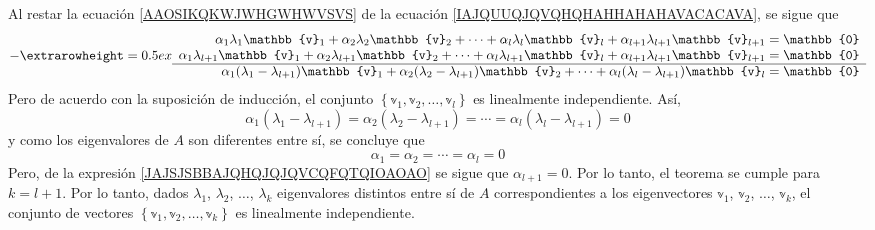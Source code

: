 \begin{theorem}
\begin{equation}
    \end{equation}
    Al restar la ecuación \eqref{AAOSIKQKWJWHGWHWVSVS} de la ecuación \eqref{IAJQUUQJQVQHQHAHHAHAHAVACACAVA}, se sigue que
    $$- {\extrarowheight = 0.5ex
    \begin{array}{r}
        \alpha_1\lambda_1\mathbb{v}_1 + \alpha_2\lambda_2\mathbb{v}_2 + \cdots + \alpha_l\lambda_l\mathbb{v}_l + \alpha_{l+1}\lambda_{l+1}\mathbb{v}_{l+1} = \mathbb{0} \\
        \alpha_1\lambda_{l+1}\mathbb{v}_1 + \alpha_2\lambda_{l+1}\mathbb{v}_2 + \cdots + \alpha_l\lambda_{l+1}\mathbb{v}_l + \alpha_{l+1}\lambda_{l+1}\mathbb{v}_{l+1} = \mathbb{0} \\
        \hline
        \alpha_1(\lambda_1 - \lambda_{l+1})\mathbb{v}_1 + \alpha_2(\lambda_2 - \lambda_{l+1})\mathbb{v}_2 + \cdots + \alpha_l(\lambda_l - \lambda_{l+1})\mathbb{v}_l = \mathbb{0}
    \end{array}}$$
    Pero de acuerdo con la suposición de inducción, el conjunto $\left\{ \mathbb{v}_1, \mathbb{v}_2, \dots, \mathbb{v}_l \right\}$ es linealmente independiente. Así,
    $$\alpha_1(\lambda_1 - \lambda_{l+1}) = \alpha_2(\lambda_2 - \lambda_{l+1}) = \cdots = \alpha_l(\lambda_l - \lambda_{l+1}) = 0$$
    y como los eigenvalores de $A$ son diferentes entre sí, se concluye que
    $$\alpha_1 = \alpha_2 = \cdots = \alpha_l = 0$$
    Pero, de la expresión \eqref{JAJSJSBBAJQHQJQJQVCQFQTQIOAOAO} se sigue que $\alpha_{l+1} = 0$. Por lo tanto, el teorema se cumple para $k = l + 1$. Por lo tanto, dados $\lambda_1$, $\lambda_2$, $\dots$, $\lambda_k$ eigenvalores distintos entre sí de $A$ correspondientes a los eigenvectores $\mathbb{v}_1$, $\mathbb{v}_2$, $\dots$, $\mathbb{v}_k$, el conjunto de vectores $\left\{ \mathbb{v}_1, \mathbb{v}_2, \dots, \mathbb{v}_k \right\}$ es linealmente independiente.
\end{theorem}

\newpage


